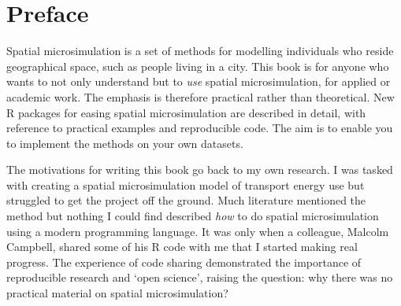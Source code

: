 \chapter*{Preface}

Spatial microsimulation is a set of methods for modelling individuals who
reside geographical space, such as people living in a city.
This book is for anyone who wants to not only understand
but to \emph{use} spatial microsimulation, for applied or academic work.
The emphasis is therefore practical rather than theoretical.
New R packages for easing spatial microsimulation are described in
detail, with reference to practical examples and reproducible code.
The aim is to enable you to implement the methods on your own
datasets. 


The motivations for writing this book go back to my own research.
I was tasked with creating a spatial microsimulation model of transport energy use but struggled to get the project off the ground.
Much literature mentioned the method but nothing I could find
described \emph{how} to do spatial microsimulation
using a modern programming language.
It was only when a colleague, Malcolm Campbell, shared some of his
R code with me that I started making real progress. The experience
of code sharing demonstrated the importance of
reproducible research and `open science', raising the question:
why there was no practical material on spatial microsimulation?

